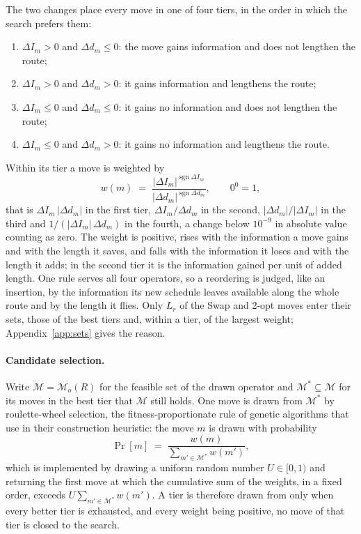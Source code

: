 \documentclass[11pt]{article}
\begin{document}
The two changes place every move in one of four tiers, in the order in which the search prefers them:
\begin{enumerate}[noitemsep, topsep=4pt, leftmargin=2em]
    \item $\Delta I_m > 0$ and $\Delta d_m \le 0$: the move gains information and does not lengthen the route;
    \item $\Delta I_m > 0$ and $\Delta d_m > 0$: it gains information and lengthens the route;
    \item $\Delta I_m \le 0$ and $\Delta d_m \le 0$: it gains no information and does not lengthen the route;
    \item $\Delta I_m \le 0$ and $\Delta d_m > 0$: it gains no information and lengthens the route.
\end{enumerate}
Within its tier a move is weighted by
\begin{equation}\label{eq:cand-weight}
    w(m) \;=\; \frac{|\Delta I_m|^{\operatorname{sgn} \Delta I_m}}{|\Delta d_m|^{\operatorname{sgn} \Delta d_m}} , \qquad 0^0 = 1 ,
\end{equation}
that is $\Delta I_m\,|\Delta d_m|$ in the first tier, $\Delta I_m / \Delta d_m$ in the second, $|\Delta d_m| / |\Delta I_m|$ in the third and $1 / (|\Delta I_m|\,\Delta d_m)$ in the fourth, a change below $10^{-9}$ in absolute value counting as zero. The weight is positive, rises with the information a move gains and with the length it saves, and falls with the information it loses and with the length it adds; in the second tier it is the information gained per unit of added length. One rule serves all four operators, so a reordering is judged, like an insertion, by the information its new schedule leaves available along the whole route and by the length it flies. Only $L_r$ of the Swap and 2-opt moves enter their sets, those of the best tiers and, within a tier, of the largest weight; Appendix~\ref{app:sets} gives the reason.

\paragraph{Candidate selection.}
Write $\mathcal{M} = \mathcal{M}_o(R)$ for the feasible set of the drawn operator and $\mathcal{M}^{\ast} \subseteq \mathcal{M}$ for its moves in the best tier that $\mathcal{M}$ still holds. One move is drawn from $\mathcal{M}^{\ast}$ by roulette-wheel selection, the fitness-proportionate rule of genetic algorithms \citep{goldberg1989genetic} that \citep{gunawan2015iterated} use in their construction heuristic: the move $m$ is drawn with probability
\begin{equation}\label{eq:roulette}
    \Pr[m] \;=\; \frac{w(m)}{\sum_{m' \in \mathcal{M}^{\ast}} w(m')},
\end{equation}
which is implemented by drawing a uniform random number $U \in [0, 1)$ and returning the first move at which the cumulative sum of the weights, in a fixed order, exceeds $U \sum_{m' \in \mathcal{M}^{\ast}} w(m')$. A tier is therefore drawn from only when every better tier is exhausted, and every weight being positive, no move of that tier is closed to the search.
\end{document}

